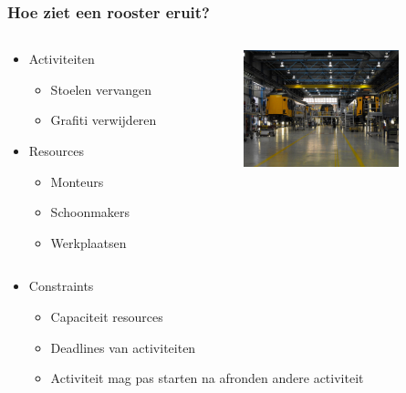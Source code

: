 \begin{frame}\frametitle{Hoe ziet een rooster eruit?}
	\begin{columns}[T]
	    \begin{column}{.4\textwidth}
			\begin{itemize}
		        \item Activiteiten
		        \begin{itemize}
		            \item Stoelen vervangen
		            \item Grafiti verwijderen      
		        \end{itemize}
		        \item Resources
	            \begin{itemize}
	                \item Monteurs
	                \item Schoonmakers
	                \item Werkplaatsen
	            \end{itemize}
		    \end{itemize}
	    \end{column}
	    \begin{column}{.5\textwidth}
	    	\includegraphics[width=4.5cm]{images/werkplaats.jpg}
	    \end{column}
  	\end{columns}
    \begin{itemize}
        \item Constraints
        \begin{itemize}
        	\item Capaciteit resources
            \item Deadlines van activiteiten
            \item Activiteit mag pas starten na afronden andere activiteit 
        \end{itemize}
    \end{itemize}
\end{frame}
